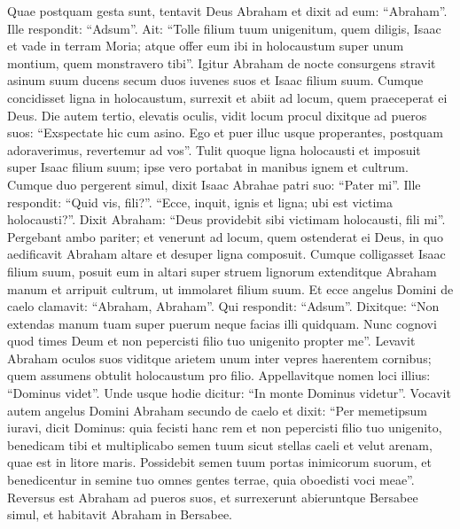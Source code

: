 \begin{biblechapter}
\begin{biblechapter}
\begin{biblechapter}
\begin{biblechapter}
\begin{biblechapter}
\begin{biblechapter}
\begin{biblechapter}
\begin{biblechapter}
\begin{biblechapter}
\begin{biblechapter}
\begin{biblechapter}
\begin{biblechapter}
\begin{biblechapter}
\begin{biblechapter}
\begin{biblechapter}
\begin{biblechapter}
\begin{biblechapter}
\begin{biblechapter}
\begin{biblechapter}
\begin{biblechapter}
\begin{biblechapter}
\begin{biblechapter}
\verse Quae postquam gesta sunt, tentavit Deus Abraham et dixit ad eum: “Abraham”. Ille respondit: “Adsum”. 
\verse Ait: “Tolle filium tuum unigenitum, quem diligis, Isaac et vade in terram Moria; atque offer eum ibi in holocaustum super unum montium, quem monstravero tibi”.
 \verse Igitur Abraham de nocte consurgens stravit asinum suum ducens secum duos iuvenes suos et Isaac filium suum. Cumque concidisset ligna in holocaustum, surrexit et abiit ad locum, quem praeceperat ei Deus. 
\verse Die autem tertio, elevatis oculis, vidit locum procul 
\verse dixitque ad pueros suos: “Exspectate hic cum asino. Ego et puer illuc usque properantes, postquam adoraverimus, revertemur ad vos”.
 \verse Tulit quoque ligna holocausti et imposuit super Isaac filium suum; ipse vero portabat in manibus ignem et cultrum. Cumque duo pergerent simul, 
\verse dixit Isaac Abrahae patri suo: “Pater mi”. Ille respondit: “Quid vis, fili?”. “Ecce, inquit, ignis et ligna; ubi est victima holocausti?”. 
\verse Dixit Abraham: “Deus providebit sibi victimam holocausti, fili mi”.
 Pergebant ambo pariter; 
\verse et venerunt ad locum, quem ostenderat ei Deus, in quo aedificavit Abraham altare et desuper ligna composuit. Cumque colligasset Isaac filium suum, posuit eum in altari super struem lignorum 
\verse extenditque Abraham manum et arripuit cultrum, ut immolaret filium suum. 
\verse Et ecce angelus Domini de caelo clamavit: “Abraham, Abraham”. Qui respondit: “Adsum”. 
 \verse Dixitque: “Non extendas manum tuam super puerum neque facias illi quidquam. Nunc cognovi quod times Deum et non pepercisti filio tuo unigenito propter me”. 
 \verse Levavit Abraham oculos suos viditque arietem unum inter vepres haerentem cornibus; quem assumens obtulit holocaustum pro filio. 
\verse Appellavitque nomen loci illius: “Dominus videt”. Unde usque hodie dicitur: “In monte Dominus videtur”.
 \verse Vocavit autem angelus Domini Abraham secundo de caelo et dixit: 
\verse “Per memetipsum iuravi, dicit Dominus: quia fecisti hanc rem et non pepercisti filio tuo unigenito, 
\verse benedicam tibi et multiplicabo semen tuum sicut stellas caeli et velut arenam, quae est in litore maris. Possidebit semen tuum portas inimicorum suorum, 
\verse et benedicentur in semine tuo omnes gentes terrae, quia oboedisti voci meae”.
 \verse Reversus est Abraham ad pueros suos, et surrexerunt abieruntque Bersabee simul, et habitavit Abraham in Bersabee.

\end{biblechapter}
\end{biblechapter}
\end{biblechapter}
\end{biblechapter}
\end{biblechapter}
\end{biblechapter}
\end{biblechapter}
\end{biblechapter}
\end{biblechapter}
\end{biblechapter}
\end{biblechapter}
\end{biblechapter}
\end{biblechapter}
\end{biblechapter}
\end{biblechapter}
\end{biblechapter}
\end{biblechapter}
\end{biblechapter}
\end{biblechapter}
\end{biblechapter}
\end{biblechapter}
\end{biblechapter}
